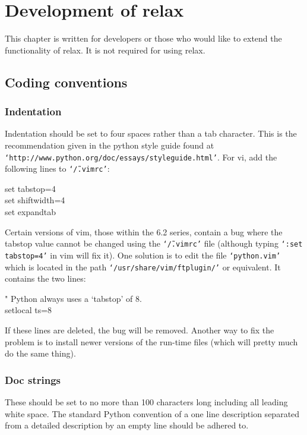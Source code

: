 
\chapter{Development of relax}

This chapter is written for developers or those who would like to extend the functionality of relax.  It is not required for using relax.




\section{Coding conventions}


\subsection{Indentation}

Indentation should be set to four spaces rather than a tab character.  This is the recommendation given in the python style guide found at \texttt{`http://www.python.org/doc/essays/styleguide.html'}.  For vi, add the following lines to \texttt{`\~/.vimrc'}:

\begin{exampleenv}
set tabstop=4 \\
set shiftwidth=4 \\
set expandtab
\end{exampleenv}

Certain versions of vim, those within the 6.2 series, contain a bug where the tabstop value cannot be changed using the \texttt{`\~/.vimrc'} file (although typing \texttt{`:set tabstop=4'} in vim will fix it).  One solution is to edit the file \texttt{`python.vim'} which is located in the path \texttt{`/usr/share/vim/ftplugin/'} or equivalent. It contains the two lines:

\begin{exampleenv}
" Python always uses a `tabstop' of 8. \\
setlocal ts=8
\end{exampleenv}

If these lines are deleted, the bug will be removed.  Another way to fix the problem is to install newer versions of the run-time files (which will pretty much do the same thing).


\subsection{Doc strings}

These should be set to no more than 100 characters long including all leading white space.  The standard Python convention of a one line description separated from a detailed description by an empty line should be adhered to.
